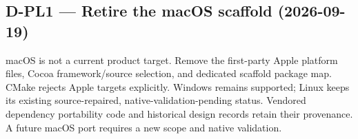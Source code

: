 \subsection*{D-PL1 --- Retire the macOS scaffold (2026-09-19)}
macOS is not a current product target. Remove the first-party Apple platform
files, Cocoa framework/source selection, and dedicated scaffold package map.
CMake rejects Apple targets explicitly. Windows remains supported; Linux keeps
its existing source-repaired, native-validation-pending status. Vendored
dependency portability code and historical design records retain their provenance.
A future macOS port requires a new scope and native validation.
